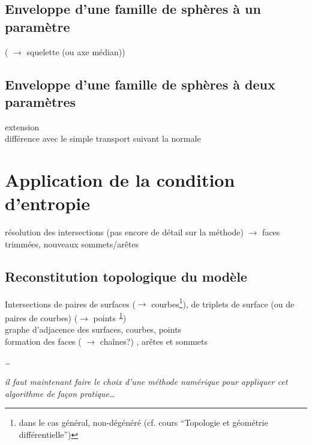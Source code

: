 \subsection{Enveloppe d'une famille de sphères à un paramètre}
 \cite{peternell1997} ( $\to$ squelette (ou axe médian))

\subsection{Enveloppe d'une famille de sphères à deux paramètres}
\label{sec:EdS_2param}
extension  \cite{gelston1995}\\
différence avec le simple transport suivant la normale \cite{jiao2001}




\section{Application de la condition d'entropie}
résolution des intersections (pas encore de détail sur la méthode) $\to$ faces trimmées, nouveaux sommets/arêtes

\subsection{Reconstitution topologique du modèle \brep}
Intersections de paires de surfaces ($\to$ courbes\footnote{dans le cas général, non-dégénéré (cf. cours ``Topologie et géométrie différentielle'')\label{foot}}), de triplets de surface (ou de paires de courbes) ($\to$ points\textsuperscript{~\ref{foot}})\\
graphe d'adjacence des surfaces, courbes, points \cite[Chap. 4]{pentcheva2010}\\
formation des faces ( $\to$ chaînes?) \cite[Chap. 7]{pentcheva2010}, arêtes et sommets \cite[Chap. 5]{pentcheva2010}

\ldots



\bigskip
\textit{il faut maintenant faire le choix d'une méthode numérique pour appliquer cet algorithme de façon pratique\ldots}